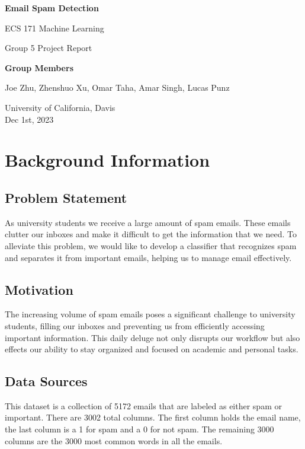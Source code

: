 \documentclass[10pt]{article}
\begin{document}
\begin{titlepage}
    \begin{center}
        \vspace*{1cm}
 
        \textbf{Email Spam Detection}
 
        \vspace{0.5cm}
        ECS 171 Machine Learning

        Group 5 Project Report
             
        \vspace{1.5cm}
 
        \textbf{Group Members}

        Joe Zhu, Zhenshuo Xu, Omar Taha, Amar Singh, Lucas Punz
 
        \vfill
             
        University of California, Davis\\
        Dec 1st, 2023
    \end{center}
\end{titlepage}

\newpage
\section*{Background Information}

\subsection*{Problem Statement}
As university students we receive a large amount of spam emails. These emails clutter our inboxes and make it difficult to get the information that we need. To alleviate this problem, we would like to develop a classifier that recognizes spam and separates it from important emails, helping us to manage email effectively.

\subsection*{Motivation}
The increasing volume of spam emails poses a significant challenge to university students, filling our inboxes and preventing us from efficiently accessing important information. This daily deluge not only disrupts our workflow but also effects our ability to stay organized and focused on academic and personal tasks.

\subsection*{Data Sources}
This dataset is a collection of 5172 emails that are labeled as either spam or important. There are 3002 total columns. The first column holds the email name, the last column is a 1 for spam and a 0 for not spam. The remaining 3000 columns are the 3000 most common words in all the emails.
\end{document}
